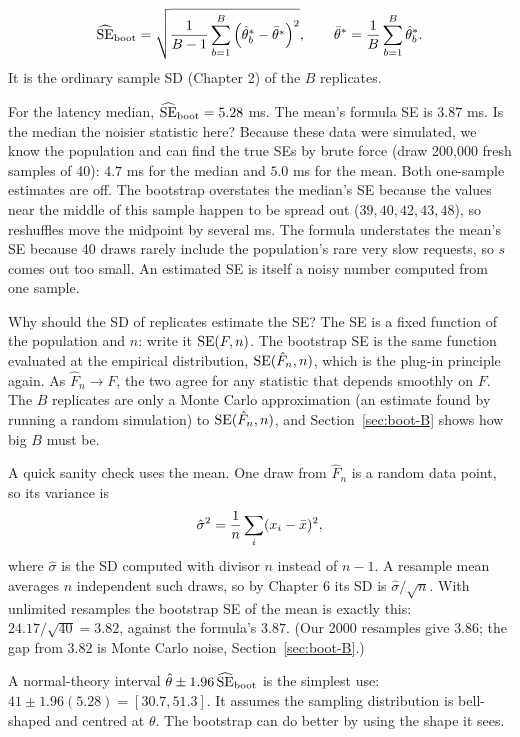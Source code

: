 \begin{definition}
\[
  \widehat{\operatorname{SE}}_{\text{boot}} = \sqrt{\frac{1}{B-1}\sum_{b=1}^{B}
  \left(\hat\theta^*_b - \bar\theta^*\right)^2},
  \qquad \bar\theta^* = \frac{1}{B}\sum_{b=1}^B \hat\theta^*_b .
\]
It is the ordinary sample SD (Chapter 2) of the $B$ replicates.
\end{definition}

For the latency median, $\widehat{\operatorname{SE}}_{\text{boot}} = 5.28$ ms. The mean's
formula SE is $3.87$ ms. Is the median the noisier statistic here? Because
these data were simulated, we know the population and can find the true SEs by
brute force (draw 200{,}000 fresh samples of 40): $4.7$ ms for the median and
$5.0$ ms for the mean. Both one-sample estimates are off. The bootstrap
overstates the median's SE because the values near the middle of this sample
happen to be spread out ($39, 40, 42, 43, 48$), so reshuffles move the midpoint
by several ms. The formula understates the mean's SE because 40 draws rarely
include the population's rare very slow requests, so $s$ comes out too small.
An estimated SE is itself a noisy number computed from one sample.

\begin{whybox}
Why should the SD of replicates estimate the SE? The SE is a fixed function
of the population and $n$: write it $\operatorname{SE}(F, n)$. The bootstrap SE is the same
function evaluated at the empirical distribution, $\operatorname{SE}(\hat F_n, n)$, which is
the plug-in principle again. As $\hat F_n \to F$, the two agree for any
statistic that depends smoothly on $F$. The $B$ replicates are only a Monte
Carlo approximation (an estimate found by running a random simulation) to
$\operatorname{SE}(\hat F_n, n)$, and Section~\ref{sec:boot-B} shows how
big $B$ must be.
\end{whybox}

A quick sanity check uses the mean. One draw from $\hat F_n$ is a random data
point, so its variance is
\[
  \hat\sigma^2 = \frac{1}{n}\sum_i (x_i - \bar{x})^2,
\]
where $\hat\sigma$ is the SD computed with divisor $n$ instead of $n-1$. A resample mean averages $n$
independent such draws, so by Chapter 6 its SD is $\hat\sigma/\sqrt n$. With
unlimited resamples the bootstrap SE of the mean is exactly this:
$24.17/\sqrt{40} = 3.82$, against the formula's $3.87$. (Our 2000 resamples
give $3.86$; the gap from $3.82$ is Monte Carlo noise,
Section~\ref{sec:boot-B}.)

A normal-theory interval $\hat\theta \pm 1.96\,\widehat{\operatorname{SE}}_{\text{boot}}$
is the simplest use: $41 \pm 1.96(5.28) = [30.7, 51.3]$. It assumes the
sampling distribution is bell-shaped and centred at $\theta$. The bootstrap can
do better by using the shape it sees.

